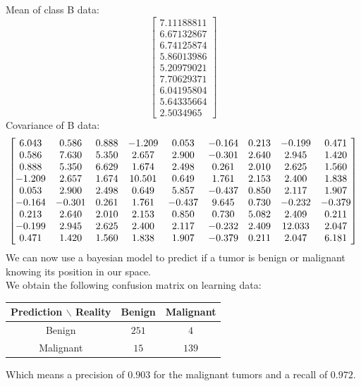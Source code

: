 \documentclass[a4paper, 10pt]{article}
\newcommand\scalemath[2]{\scalebox{#1}{\mbox{\ensuremath{\displaystyle #2}}}}
\begin{document}
Mean of class B data:
$$
\begin{bmatrix}
    7.11188811\\
    6.67132867\\
    6.74125874\\
    5.86013986\\
    5.20979021\\
    7.70629371\\
    6.04195804\\
    5.64335664\\
    2.5034965
\end{bmatrix}
$$
Covariance of B data:
$$
\scalemath{1}{
    \begin{bmatrix}
    6.043 & 0.586 & 0.888 & -1.209 & 0.053 & -0.164 & 0.213 & -0.199 & 0.471\\
    0.586 & 7.630 & 5.350 & 2.657 & 2.900 & -0.301 & 2.640 & 2.945 & 1.420\\
    0.888 & 5.350 & 6.629 & 1.674 & 2.498 & 0.261 & 2.010 & 2.625 & 1.560\\
    -1.209 & 2.657 & 1.674 & 10.501 & 0.649 & 1.761 & 2.153 & 2.400 & 1.838\\
    0.053 & 2.900 & 2.498 & 0.649 & 5.857 & -0.437 & 0.850 & 2.117 & 1.907\\
    -0.164 & -0.301 & 0.261 & 1.761 & -0.437 & 9.645 & 0.730 & -0.232 & -0.379\\
    0.213 & 2.640 & 2.010 & 2.153 & 0.850 & 0.730 & 5.082 & 2.409 & 0.211\\
    -0.199 & 2.945 & 2.625 & 2.400 & 2.117 & -0.232 & 2.409 & 12.033 & 2.047\\
    0.471 & 1.420 & 1.560 & 1.838 & 1.907 & -0.379 & 0.211 & 2.047 & 6.181
\end{bmatrix}
}
$$
We can now use a bayesian model to predict if a tumor is benign or malignant knowing its position in our space.
\\
We obtain the following confusion matrix on learning data:
\begin{center}
    \begin{tabular}{ |c|c|c| }
        \hline
        Prediction $\backslash$ Reality & Benign & Malignant \\
        \hline
        Benign & $251$ & $4$ \\
        \hline
        Malignant & $15$ & $139$ \\ 
        \hline
    \end{tabular}
\end{center}
Which means a precision of $0.903$ for the malignant tumors and a recall of $0.972$.
\end{document}
